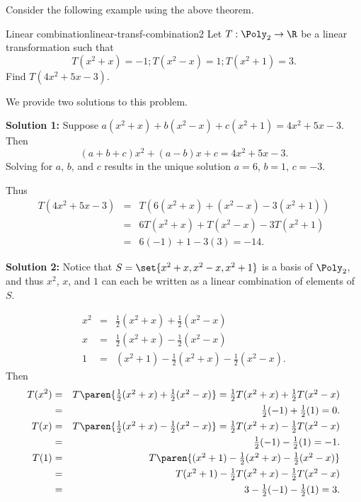 Consider the following example using the above theorem. 

\begin{example}{Linear combination}{linear-transf-combination2}
Let $T:\Poly_2 \to \R$ be a linear transformation such that
\[ T(x^2+x)=-1; T(x^2-x)=1; T(x^2+1)=3.\]
Find $T(4x^2+5x-3)$.
\end{example}

\begin{solution}
We provide two solutions to this problem.

\textbf{Solution 1:}
Suppose
$a(x^2+x) + b(x^2-x) + c(x^2+1) = 4x^2+5x-3$. 
Then
\[ (a+b+c)x^2 + (a-b)x + c = 4x^2+5x-3.\]
Solving for $a$, $b$, and $c$ results in the unique solution
$a=6$, $b=1$, $c=-3$.

Thus
\begin{eqnarray*}
T(4x^2+5x-3) & = & T(6(x^2+x) + (x^2-x) -3(x^2+1)) \\
& = & 6T(x^2+x) + T(x^2-x) -3T(x^2+1) \\
& = & 6(-1) + 1 -3(3) = -14.
\end{eqnarray*}

\textbf{Solution 2:}
Notice that
$S=\set{x^2+x, x^2-x, x^2+1}$ is a basis of $\Poly_2$, and
thus $x^2$, $x$, and $1$ can each be written as a linear 
combination of elements of $S$.

\begin{eqnarray*}
x^2 & = & \textstyle \frac{1}{2}(x^2+x) + \frac{1}{2}(x^2-x) \\
x & = & \textstyle \frac{1}{2}(x^2+x) - \frac{1}{2}(x^2-x) \\
1 & = & (x^2+1)-\textstyle \frac{1}{2}(x^2+x) - \frac{1}{2}(x^2-x).
\end{eqnarray*}
Then
\begin{eqnarray*}
T(x^2) & = & \textstyle T\paren{\frac{1}{2}(x^2+x) + \frac{1}{2}(x^2-x)}
=\frac{1}{2}T(x^2+x) + \frac{1}{2}T(x^2-x)\\
& = & \textstyle \frac{1}{2}(-1) + \frac{1}{2}(1) = 0.  \\
T(x) & = & \textstyle T\paren{\frac{1}{2}(x^2+x) - \frac{1}{2}(x^2-x)}
= \frac{1}{2}T(x^2+x) - \frac{1}{2}T(x^2-x) \\
& = & \textstyle \frac{1}{2}(-1) - \frac{1}{2}(1) = -1.\\
T(1) & = & \textstyle T\paren{(x^2+1)-\frac{1}{2}(x^2+x) -
\frac{1}{2}(x^2-x)}\\
& = & \textstyle T(x^2+1)-\frac{1}{2}T(x^2+x) - \frac{1}{2}T(x^2-x) \\
& = & \textstyle 3-\frac{1}{2}(-1) - \frac{1}{2}(1) = 3.
\end{eqnarray*}


\end{solution}
